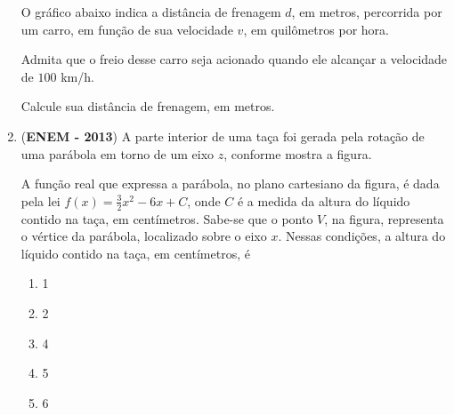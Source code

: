 \begin{enumerate}
O gráfico abaixo indica a distância de frenagem \(d\), em metros, percorrida por um carro, em função de sua velocidade \(v\), em quilômetros por hora.

Admita que o freio desse carro seja acionado quando ele alcançar a velocidade de \(100\) km/h.

Calcule sua distância de frenagem, em metros.

\item (\textbf{ENEM - 2013}) A parte interior de uma taça foi gerada pela rotação de uma parábola em torno de um eixo \(z\), conforme mostra a figura.

\begin{figure}[H]
\centering

\end{figure}

A função real que expressa a parábola, no plano cartesiano da figura, é dada pela lei \(\displaystyle f(x)=\frac{3}{2}x^2-6x+C\), onde \(C\) é a medida da altura do líquido contido na taça, em centímetros. Sabe-se que o ponto \(V\), na figura, representa o vértice da parábola, localizado sobre o eixo \(x\).
Nessas condições, a altura do líquido contido na taça, em centímetros, é
\begin{enumerate}
\item 1
\item 2
\item 4
\item 5
\item 6
\end{enumerate}


\end{enumerate}
